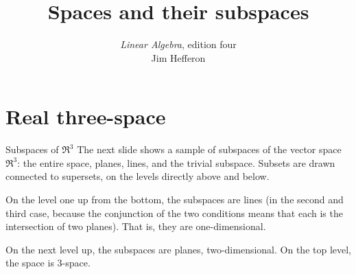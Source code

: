 \usepackage{linalgjh}
\usepackage{present}
\usepackage{directories} %
\usepackage{xr} %
\usepackage{catchfilebetweentags}
\usepackage{etoolbox} %
\makeatletter
\patchcmd{\CatchFBT@Fin@l}{\endlinechar\m@ne}{}
  {}{}
\makeatother

{
}
\hypersetup{colorlinks=true,linkcolor=blue} 

\title[Spaces and their subspaces] %
{Spaces and their subspaces}

\author{\textit{Linear Algebra}, edition four \\ {\small Jim Hef{}feron}}
\date{}


\subject{Spaces and their subspaces}


\begin{frame}
  \titlepage
\end{frame}


\section{Real three-space}
\begin{frame}{Subspaces of $\Re^3$}
The next slide shows a sample of subspaces of the vector space~$\Re^3$:
the entire space, planes, lines, and the trivial subspace.
Subsets are drawn connected to supersets, on the levels 
directly above and below.

On the level one up from the bottom, the subspaces are lines 
(in the second and third case, because
the conjunction of the two conditions means that each is the 
intersection of two planes).
That is, they are one-dimensional.

On the next level up, the subspaces are planes, two-dimensional.
On the top level, the space is $3$-space.
\end{frame}

